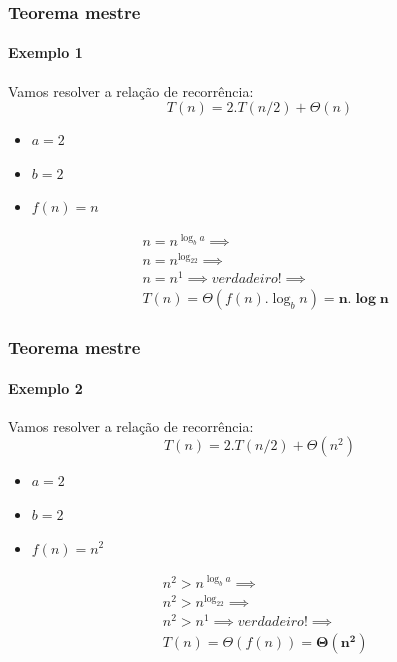 \begin{frame}
	\frametitle{Teorema mestre}
	\framesubtitle{Exemplo 1}
	\par Vamos resolver a relação de recorrência:
	\begin{equation}
		T(n) = 2.T(n/2) + \Theta(n)
	\end{equation}
	
	\begin{itemize}
		\item $a = 2$ 
		\item $b = 2$ 
		\item $f(n) = n$ 
	\end{itemize}
	
	\begin{equation}
		\begin{aligned}
		&n = n^{\log_ba} \implies \\
		&n = n^{\log_22} \implies \\
		&n = n^1 \implies verdadeiro! \implies \\
		&T(n)=\Theta(f(n).\log_bn) = \mathbf{n.\log n}
		\end{aligned}
	\end{equation}
\end{frame}

\begin{frame}
	\frametitle{Teorema mestre}
	\framesubtitle{Exemplo 2}
	\par Vamos resolver a relação de recorrência:
	\begin{equation}
		T(n) = 2.T(n/2) + \Theta(n^2)
	\end{equation}
	
	\begin{itemize}
		\item $a = 2$ 
		\item $b = 2$ 
		\item $f(n) = n^2$ 
	\end{itemize}
	
	\begin{equation}
		\begin{aligned}
			&n^2 > n^{\log_ba} \implies \\
			&n^2 > n^{\log_22} \implies \\
			&n^2 > n^1 \implies verdadeiro! \implies \\
			&T(n)=\Theta(f(n)) = \mathbf{\Theta(n^2)}
		\end{aligned}
	\end{equation}
\end{frame}

